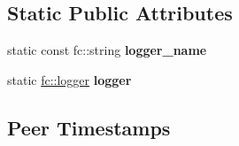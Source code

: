 \subsection*{Static Public Attributes}
\begin{DoxyCompactItemize}
\item 
\mbox{\label{classaacio_1_1connection_a887f3bfecf6e59f77b4a513c93b40181}} 
static const fc\+::string {\bfseries logger\+\_\+name}
\item 
\mbox{\label{classaacio_1_1connection_af253101c9f4664eae92f580a85bb81ca}} 
static \mbox{\hyperlink{classfc_1_1logger}{fc\+::logger}} {\bfseries logger}
\end{DoxyCompactItemize}
\subsection*{Peer Timestamps}
\label{_amgrpbf57b60a299a3ba4ea0f7bacd87c39f3}%
